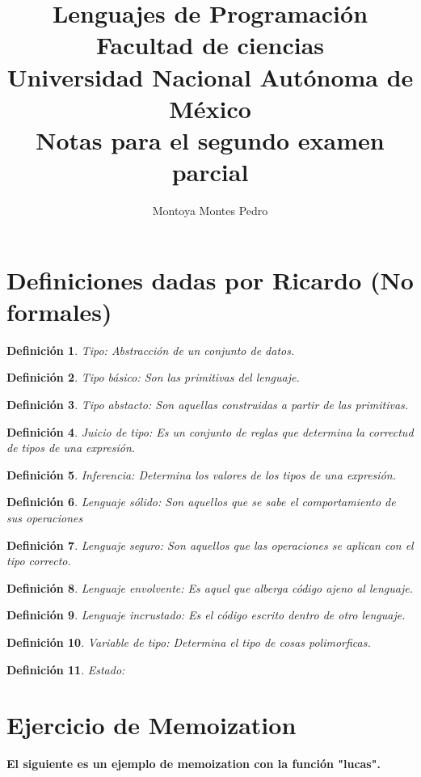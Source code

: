 \documentclass[letterpaper, 12pt]{article}
\title{Lenguajes de Programación\\Facultad de ciencias\\ Universidad Nacional Autónoma de México\\ Notas para el segundo examen parcial}
\author{Montoya Montes Pedro}
\newtheorem{definicion}{Definición}
\begin{document}
\maketitle

\tableofcontents
\newpage

\section{Definiciones dadas por Ricardo (No formales)}
	\begin{definicion}
		Tipo: Abstracción de un conjunto de datos.
	\end{definicion}
	\begin{definicion}
		Tipo básico: Son las primitivas del lenguaje.
	\end{definicion}	
	\begin{definicion}
		Tipo abstacto: Son aquellas construidas a partir de las primitivas.
	\end{definicion}
	\begin{definicion}
		Juicio de tipo: Es un conjunto de reglas que determina la correctud de tipos de una expresión.
	\end{definicion}	
	\begin{definicion}
		Inferencia: Determina los valores de los tipos de una expresión.
	\end{definicion}
	\begin{definicion}
		Lenguaje sólido: Son aquellos que se sabe el comportamiento de sus operaciones
	\end{definicion}
	\begin{definicion}
		Lenguaje seguro: Son aquellos que las operaciones se aplican con el tipo correcto.
	\end{definicion}	
	\begin{definicion}
		Lenguaje envolvente: Es aquel que alberga código ajeno al lenguaje.
	\end{definicion}
	\begin{definicion}
		Lenguaje incrustado: Es el código escrito dentro de otro lenguaje.
	\end{definicion}
	\begin{definicion}
		Variable de tipo: Determina el tipo de cosas polimorficas.
	\end{definicion}
	\begin{definicion}
		Estado: 	
	\end{definicion}	
\newpage
\section{Ejercicio de Memoization}
\textbf{El siguiente es un ejemplo de memoization con la función "lucas".}
\end{document}
